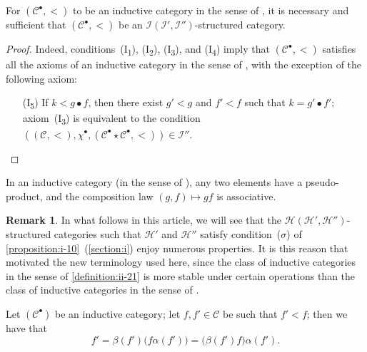 \documentclass[a4paper,fleqn]{article}
\theoremstyle{plain}
\newenvironment{proposition}[1]
  {\renewcommand\theinnerproposition{#1}\innerproposition}
  {\endinnerproposition}
\newenvironment{corollary}[1]
  {\renewcommand\theinnercorollary{#1}\innercorollary}
  {\endinnercorollary}
\theoremstyle{definition}
\newtheorem*{remark}{Remark}
\newcommand{\CC}{\mathcal{C}}
\newcommand{\HH}{\mathcal{H}}
\newcommand{\II}{\mathcal{I}}
\begin{document}
\begin{corollary}{1}
  For $(\CC^\bullet,<)$ to be an inductive category in the sense of \cite{3c}, it is necessary and sufficient that $(\CC^\bullet,<)$ be an $\II(\II',\II'')$-structured category.
\end{corollary}

\begin{proof}
  Indeed, conditions~(I\textsubscript{1}), (I\textsubscript{2}), (I\textquotesingle\!\textsubscript{3}), and (I\textquotesingle\!\textsubscript{4}) imply that $(\CC^\bullet,<)$ satisfies all the axioms of an inductive category in the sense of \cite{3c}, with the exception of the following axiom:
  \begin{enumerate}
    \item[\normalfont(I\textquotesingle\!\textsubscript{5})]
      If $k<g\bullet f$, then there exist $g'<g$ and $f'<f$ such that $k=g'\bullet f'$;
      axiom~(I\textquotesingle\!\textsubscript{3}) is equivalent to the condition $((\CC,<),\chi^\bullet,(\CC^\bullet\star\CC^\bullet,<))\in\II''$.
      \qedhere
  \end{enumerate}
\end{proof}

\begin{corollary}{2}
  In an inductive category (in the sense of \cite{3c}), any two elements have a pseudo-product, and the composition law $(g,f)\mapsto gf$ is associative.
\end{corollary}

\begin{remark}
  In what follows in this article, we will see that the $\HH(\HH',\HH'')$-structured categories such that $\HH'$ and $\HH''$ satisfy condition~($\sigma$) of \cref{proposition:i-10}~(\cref{section:i}) enjoy numerous properties.
  It is this reason that motivated the new terminology used here, since the class of inductive categories in the sense of \cref{definition:ii-21} is more stable under certain operations than the class of inductive categories in the sense of \cite{3c}.
\end{remark}

\begin{proposition}{24}
\label{proposition:ii-24}
  Let $(\CC^\bullet)$ be an inductive category;
  let $f,f'\in\CC$ be such that $f'<f$;
  then we have that
  \[
    f'
    = \beta(f')\big(f\alpha(f')\big)
    = \big(\beta(f')f)\alpha(f').
  \]
\end{proposition}
\end{document}
